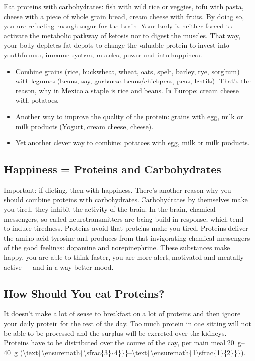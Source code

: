 \documentclass[../main.tex]{subfiles}
\begin{document}
    Eat proteins with carbohydrates: fish with wild rice or veggies, tofu with pasta, cheese with a piece of whole grain bread,
    cream cheese with fruits.
    By doing so, you are refueling enough sugar for the brain.
    Your body is neither forced to activate the metabolic pathway of ketosis nor to digest the muscles.
    That way, your body depletes fat depots to change the valuable protein to invest
    into youthfulness, immune system, muscles, power und into happiness.
    \begin{itemize}
    \item Combine grains (rice, buckwheat, wheat, oats, spelt, barley, rye, sorghum) with legumes (beans, soy, garbanzo beans/chickpeas, peas, lentils).
      That's the reason, why in Mexico a staple is rice and beans. In Europe: cream cheese with potatoes.
    \item Another way to improve the quality of the protein: grains with egg, milk or milk products (Yogurt, cream cheese, cheese).
      \item Yet another clever way to combine: potatoes with egg, milk or milk products.
      \end{itemize}

      \subsection{Happiness = Proteins and Carbohydrates}

      Important: if dieting, then with  happiness.
      There's another reason why you should combine proteins with carbohydrates.
      Carbohydrates by themselves make you tired, they inhibit the activity of the brain.
      In the brain, chemical messengers, so called neurotransmitters are being build in response, which tend to induce tiredness.
      Proteins avoid that proteins make you tired.
      Proteins deliver the amino acid tyrosine and produces from that invigorating chemical messengers of the good feelings:
      dopamine and norepinephrine.
      These substances make happy, you are able to think faster, you are more alert, motivated and mentally active --- and in a way better mood.

      \subsection{How Should You eat Proteins?}

      It doesn't make a lot of sense to breakfast on a lot of proteins and then ignore your daily protein for the rest of the day.
      Too much protein in one sitting will not be able to be processed and the surplus will be excreted over the kidneys.
      Proteins have to be distributed over the course of the day, per main meal \SIrange{20}{40}{\g}
      (\SIrange[parse-numbers=false]{\text{\ensuremath{\sfrac{3}{4}}}}{\text{\ensuremath{1\sfrac{1}{2}}}}{\oz}).
\end{document}
